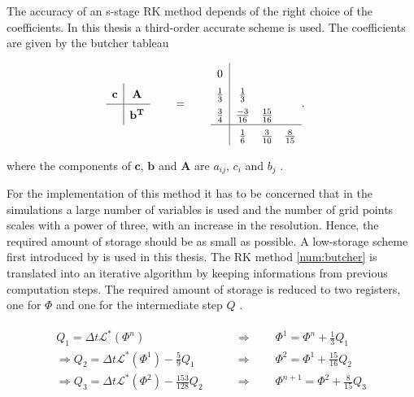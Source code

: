 The accuracy of an s-stage RK method depends of the right choice of the coefficients.
In this thesis a third-order accurate scheme is used.
The coefficients are given by the butcher tableau

\begin{align}
    \label{num:butcher}
    \def\arraystretch{1.5}%
    \begin{array}{c|c}
        \mathbf{c} & \mathbf{A}\\
        \hline     & \mathbf{b^T} \\
    \end{array}
    \qquad &= \qquad
    \def\arraystretch{1.5}%
    \begin{array}{c|ccc}
            0 \\
                    \frac{1}{3} & \frac{1}{3} \\
            \frac{3}{4} & \frac{-3}{16} & \frac{15}{16} \\
            \hline & \frac{1}{6} & \frac{3}{10} & \frac{8}{15}
    \end{array}.
\end{align}

where the components of $\mathbf{c}$, $\mathbf{b}$ and $\mathbf{A}$ are $a_{ij}$, $c_i$ and $b_j$ \citep{umwelt}.

For the implementation of this method it has to be concerned that in the simulations a large number of variables is used
and the number of grid points scales with a power of three, with an increase in the resolution.
Hence, the required amount of storage should be as small as possible.
A low-storage scheme first introduced by \citep{Williamson1980} is used in this thesis.
The RK method \ref{num:butcher} is translated into an iterative algorithm by keeping informations from previous computation steps.
The required amount of storage is reduced to two registers, one for $\Phi$ and one for the intermediate step $Q$  \citep{umwelt}.

\begin{align}
    \begin{split}
    Q_1 = \Delta t \mathcal{L}^*\left(\Phi^n\right)\qquad &\Rightarrow \qquad \Phi^{1} = \Phi^n + \frac{1}{3}Q_1 \\
    \Rightarrow Q_2 = \Delta t \mathcal{L}^*\left(\Phi^1\right) - \frac{5}{9} Q_1 \qquad &\Rightarrow \qquad \Phi^{2} = \Phi^1 + \frac{15}{16}Q_2 \\
   \Rightarrow  Q_3 = \Delta t \mathcal{L}^*\left(\Phi^2\right) - \frac{153}{128} Q_2 \qquad &\Rightarrow \qquad \Phi^{n+1} = \Phi^2 + \frac{8}{15}Q_3 \\
    \end{split}
\end{align}


